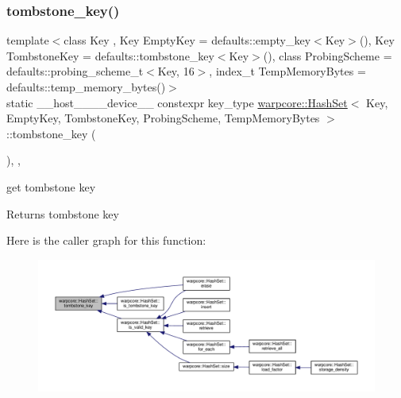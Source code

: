 \subsubsection{\texorpdfstring{tombstone\+\_\+key()}{tombstone\_key()}}
{\footnotesize\ttfamily template$<$class Key , Key Empty\+Key = defaults\+::empty\+\_\+key$<$\+Key$>$(), Key Tombstone\+Key = defaults\+::tombstone\+\_\+key$<$\+Key$>$(), class Probing\+Scheme  = defaults\+::probing\+\_\+scheme\+\_\+t$<$\+Key, 16$>$, index\+\_\+t Temp\+Memory\+Bytes = defaults\+::temp\+\_\+memory\+\_\+bytes()$>$ \\
static \+\_\+\+\_\+host\+\_\+\+\_\+\+\_\+\+\_\+device\+\_\+\+\_\+ constexpr key\+\_\+type \hyperlink{classwarpcore_1_1HashSet}{warpcore\+::\+Hash\+Set}$<$ Key, Empty\+Key, Tombstone\+Key, Probing\+Scheme, Temp\+Memory\+Bytes $>$\+::tombstone\+\_\+key (\begin{DoxyParamCaption}{ }\end{DoxyParamCaption})\hspace{0.3cm}{\ttfamily [inline]}, {\ttfamily [static]}, {\ttfamily [noexcept]}}



get tombstone key 

\begin{DoxyReturn}{Returns}
tombstone key 
\end{DoxyReturn}
Here is the caller graph for this function\+:
\nopagebreak
\begin{figure}[H]
\begin{center}
\leavevmode
\includegraphics[width=350pt]{classwarpcore_1_1HashSet_af11b7b19315de5409098eaeb31702c63_icgraph}
\end{center}
\end{figure}
